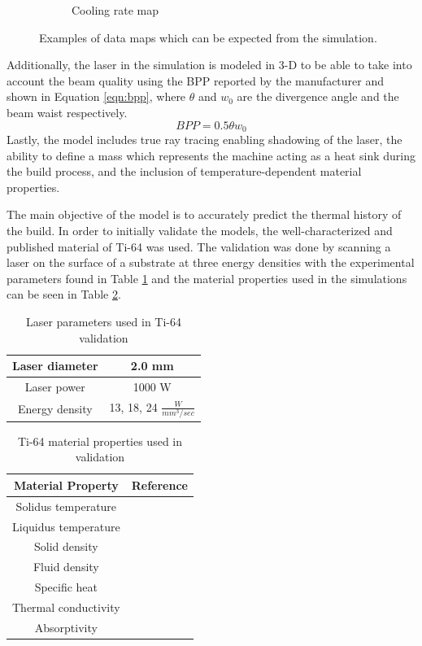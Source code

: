 \documentclass[pdflatex,sn-mathphys]{sn-jnl}
\begin{document}
\begin{figure}[!htb]
\begin{subfigure}[c]{0.3\textwidth}
				\caption{Cooling rate map}
				\label{fig:COOLRATE}
				\end{subfigure}
		\caption{Examples of data maps which can be expected from the simulation.}
		\label{fig:data_maps}	
	\end{figure}
	Additionally, the laser in the simulation is modeled in 3-D to be able to take into account the beam quality using the \ac{BPP} reported by the manufacturer and shown in Equation \ref{eqn:bpp}, where $\theta$ and $w_0$ are the divergence angle and the beam waist respectively.
	\begin{equation}\label{eqn:bpp}
		BPP = 0.5 \theta w_0
	\end{equation} 
	Lastly, the model includes true ray tracing enabling shadowing of the laser, the ability to define a mass which represents the machine acting as a heat sink during the build process, and the inclusion of temperature-dependent material properties.
	
	The main objective of the model is to accurately predict the thermal history of the build.  
	In order to initially validate the models, the well-characterized and published material of Ti-64 was used.  The validation was done by scanning a laser on the surface of a substrate at three energy densities with the experimental parameters found in Table \ref{tab:ti64_parameters} and the material properties used in the simulations can be seen in Table \ref{tab:ti64_properties}.
	\begin{table}[!htb] \centering
		\caption{Laser parameters used in Ti-64 validation}
		\label{tab:ti64_parameters}
			\begin{tabular}{|c|c|} \hline 
				Laser diameter & 2.0 mm \\ \hline
				Laser power & 1000 W \\ \hline
				Energy density & 13, 18, 24 $\frac{W}{mm^3/sec}$ \\ \hline
			\end{tabular}
	\end{table}
	\begin{table}[!htb] \centering
		\caption{Ti-64  material properties used in validation}
		\label{tab:ti64_properties}
		\begin{tabular}{|c|c|} \hline
			Material Property & Reference \\ \hline
			Solidus temperature & \cite{welschgerhard_1993} \\ \hline
			Liquidus temperature & \cite{mills_2002} \\ \hline
			Solid density  & \cite{mills_2002} \\ \hline
			Fluid density & \cite{mills_2002} \\ \hline
			Specific heat & \cite{boivineau_2006} \\ \hline
			Thermal conductivity & \cite{boivineau_2006} \\ \hline
			Absorptivity & \cite{fan_2012} \\ \hline
		\end{tabular}
	\end{table}
	
\end{document}
